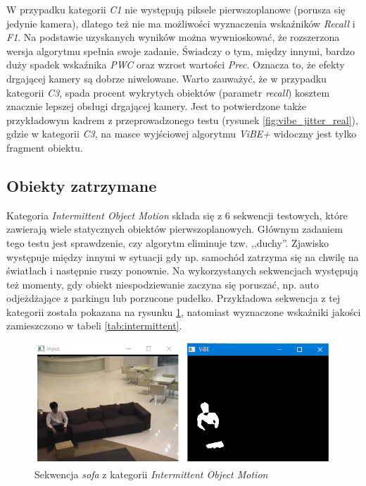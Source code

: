 W przypadku kategorii \textit{C1} nie występują piksele pierwszoplanowe (porusza się jedynie kamera), dlatego też nie ma możliwości wyznaczenia wskaźników \textit{Recall} i \textit{F1}. 
Na podstawie uzyskanych wyników można wywnioskować, że rozszerzona wersja algorytmu spełnia swoje zadanie. 
Świadczy o tym, między innymi, bardzo duży spadek wskaźnika \textit{PWC} oraz wzrost wartości \textit{Prec}. 
Oznacza to, że efekty drgającej kamery są dobrze niwelowane. 
Warto zauważyć, że w przypadku kategorii \textit{C3}, spada procent wykrytych obiektów (parametr \textit{recall}) kosztem znacznie lepszej obsługi drgającej kamery. 
Jest to potwierdzone także przykładowym kadrem z przeprowadzonego testu (rysunek \ref{fig:vibe_jitter_real}), gdzie w kategorii \textit{C3}, na masce wyjściowej algorytmu \textit{ViBE+} widoczny jest tylko fragment obiektu.

\subsection{Obiekty zatrzymane}
\label{subsec:obiekty_zatrzymane}

Kategoria \textit{Intermittent Object Motion} składa się z 6 sekwencji testowych, które zawierają wiele statycznych obiektów pierwszoplanowych. Głównym zadaniem tego testu jest sprawdzenie, czy algorytm eliminuje tzw. ,,duchy''. 
Zjawisko występuje między innymi w sytuacji gdy np. samochód zatrzyma się na chwilę na światłach i następnie ruszy ponownie. 
Na wykorzystanych sekwencjach występują też momenty, gdy obiekt niespodziewanie zaczyna się poruszać, np. auto odjeżdżające z parkingu lub porzucone pudełko. 
Przykładowa sekwencja z tej kategorii została pokazana na rysunku \ref{fig:stopped_example}, natomiast wyznaczone wskaźniki jakości zamieszczono w tabeli \ref{tab:intermittent}.

    \begin{figure}[h]
			\centering
			\includegraphics[scale=0.85]{img/5/stopped_example.png}
			\caption{Sekwencja \textit{sofa} z kategorii \textit{Intermittent Object Motion}}
			\label{fig:stopped_example}
	\end{figure}

